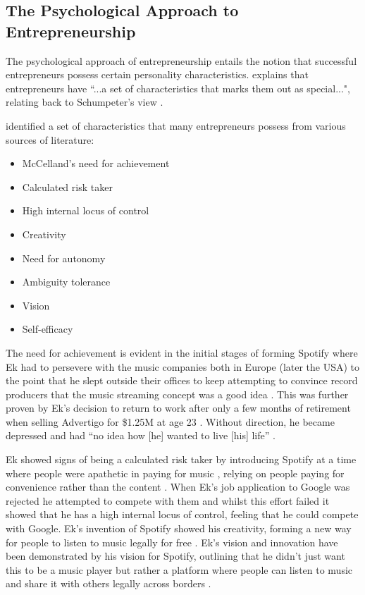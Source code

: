 \subsection{The Psychological Approach to Entrepreneurship}
The psychological approach of entrepreneurship entails the notion that successful entrepreneurs possess certain personality characteristics. \textcite[][13]{deakins2012} explains that entrepreneurs have ``...a set of characteristics that marks them out as special...", relating back to Schumpeter's view \parencite[][9]{deakins2012}.
\par
\textcite[][14]{deakins2012} identified a set of characteristics that many entrepreneurs possess from various sources of literature:
\begin{itemize}
    \item McCelland's need for achievement
    \item Calculated risk taker
    \item High internal locus of control
    \item Creativity
    \item Need for autonomy
    \item Ambiguity tolerance
    \item Vision
    \item Self-efficacy
\end{itemize}
The need for achievement is evident in the initial stages of forming Spotify where Ek had to persevere with the music companies both in Europe (later the USA) to the point that he slept outside their offices to keep attempting to convince record producers that the music streaming concept was a good idea \parencite{guardian_save_or_destroy}. This was further proven by Ek's decision to return to work after only a few months of retirement when selling Advertigo for \$1.25M at age 23 \parencite{Taube2014}. Without direction, he became depressed and had ``no idea how [he] wanted to live [his] life'' \parencite{Taube2014}.
\par
Ek showed signs of being a calculated risk taker by introducing Spotify at a time where people were apathetic in paying for music \parencite{guardian_save_or_destroy}, relying on people paying for convenience rather than the content \parencite{guardian_save_or_destroy}. When Ek's job application to Google was rejected \parencite{ft_lunch_ek} he attempted to compete with them and whilst this effort failed \parencite{ft_lunch_ek} it showed that he has a high internal locus of control, feeling that he could compete with Google. Ek's invention of Spotify showed his creativity, forming a new way for people to listen to music legally for free \parencite{dyer2013}. Ek's vision and innovation have been demonstrated by his vision for Spotify, outlining that he didn't just want this to be a music player but rather a platform where people can listen to music and share it with others legally across borders \parencite{dyer2013}.
